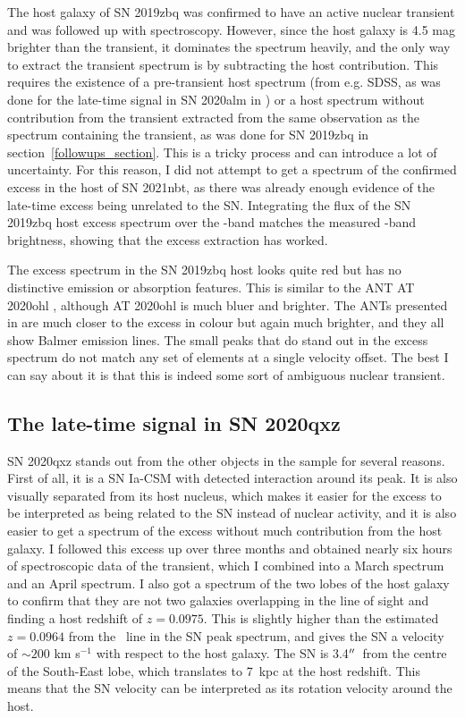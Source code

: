 \documentclass[a4paper,oneside,12pt, class=Latex/Classes/PhDthesisPSnPDF, crop=false]{standalone}
\begin{document}
The host galaxy of SN 2019zbq was confirmed to have an active nuclear transient and was followed up with spectroscopy. However, since the host galaxy is 4.5 mag brighter than the transient, it dominates the spectrum heavily, and the only way to extract the transient spectrum is by subtracting the host contribution. This requires the existence of a pre-transient host spectrum (from e.g. SDSS, as was done for the late-time signal in SN 2020alm in \citealt{Terwel_2024_paper1}) or a host spectrum without contribution from the transient extracted from the same observation as the spectrum containing the transient, as was done for SN 2019zbq in section~\ref{followups_section}. This is a tricky process and can introduce a lot of uncertainty. For this reason, I did not attempt to get a spectrum of the confirmed excess in the host of SN 2021nbt, as there was already enough evidence of the late-time excess being unrelated to the SN. Integrating the flux of the SN 2019zbq host excess spectrum over the \ztfr-band matches the measured \ztfr-band brightness, showing that the excess extraction has worked.

The excess spectrum in the SN 2019zbq host looks quite red but has no distinctive emission or absorption features. This is similar to the ANT AT 2020ohl \citep{2020ohl_Hinkle}, although AT 2020ohl is much bluer and brighter. The ANTs presented in \citet{wiseman_ztfants} are much closer to the excess in colour but again much brighter, and they all show Balmer emission lines. The small peaks that do stand out in the excess spectrum do not match any set of elements at a single velocity offset. The best I can say about it is that this is indeed some sort of ambiguous nuclear transient.


\subsection{The late-time signal in SN 2020qxz}
\label{2020qzx_discussion}
SN 2020qxz stands out from the other objects in the sample for several reasons. First of all, it is a SN Ia-CSM with detected interaction around its peak. It is also visually separated from its host nucleus, which makes it easier for the excess to be interpreted as being related to the SN instead of nuclear activity, and it is also easier to get a spectrum of the excess without much contribution from the host galaxy. I followed this excess up over three months and obtained nearly six hours of spectroscopic data of the transient, which I combined into a March spectrum and an April spectrum. I also got a spectrum of the two lobes of the host galaxy to confirm that they are not two galaxies overlapping in the line of sight and finding a host redshift of $z=0.0975$. This is slightly higher than the estimated $z=0.0964$ from the \Halpha\ line in the SN peak spectrum, and gives the SN a velocity of $\sim200$ km s$^{-1}$ with respect to the host galaxy. The SN is 3.4$^{\prime\prime}$\ from the centre of the South-East lobe, which translates to 7~kpc at the host redshift. This means that the SN velocity can be interpreted as its rotation velocity around the host.
\end{document}
